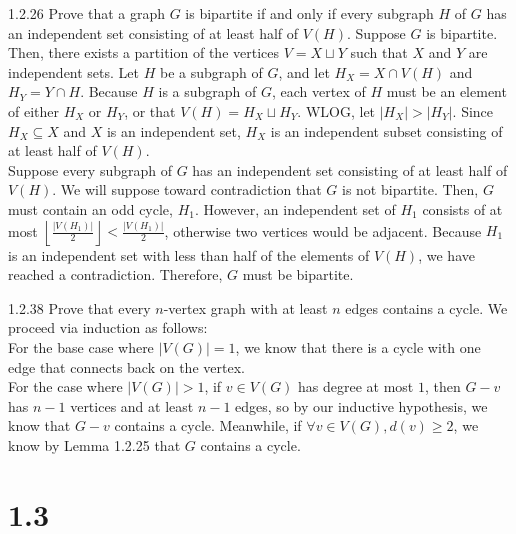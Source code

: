 \documentclass[9pt]{extarticle}
\begin{document}
\begin{problem}{1.2.26}
  Prove that a graph $G$ is bipartite if and only if every subgraph $H$ of $G$ has an independent set consisting of at least half of $V(H)$.
  \tcblower
  Suppose $G$ is bipartite. Then, there exists a partition of the vertices $V = X\sqcup Y$ such that $X$ and $Y$ are independent sets. Let $H$ be a subgraph of $G$, and let $H_X = X\cap V(H)$ and $H_Y = Y\cap H$. Because $H$ is a subgraph of $G$, each vertex of $H$ must be an element of either $H_X$ or $H_Y$, or that $V(H) = H_X \sqcup H_Y$. WLOG, let $|H_X|>|H_Y|$. Since $H_X\subseteq X$ and $X$ is an independent set, $H_X$ is an independent subset consisting of at least half of $V(H)$.\\

  Suppose every subgraph of $G$ has an independent set consisting of at least half of $V(H)$. We will suppose toward contradiction that $G$ is not bipartite. Then, $G$ must contain an odd cycle, $H_1$. However, an independent set of $H_1$ consists of at most $\left\lfloor \frac{|V(H_1)|}{2}\right\rfloor < \frac{|V(H_1)|}{2}$, otherwise two vertices would be adjacent. Because $H_1$ is an independent set with less than half of the elements of $V(H)$, we have reached a contradiction. Therefore, $G$ must be bipartite.
\end{problem}
\begin{problem}{1.2.38}
  Prove that every $n$-vertex graph with at least $n$ edges contains a cycle.
  \tcblower
  We proceed via induction as follows:\\

  For the base case where $|V(G)| = 1$, we know that there is a cycle with one edge that connects back on the vertex.\\

  For the case where $|V(G)| > 1$, if $v\in V(G)$ has degree at most $1$, then $G-v$ has $n-1$ vertices and at least $n-1$ edges, so by our inductive hypothesis, we know that $G-v$ contains a cycle. Meanwhile, if $\forall v\in V(G), d(v)\geq 2$, we know by Lemma 1.2.25 that $G$ contains a cycle.
\end{problem}
\section*{1.3}%
\end{document}

